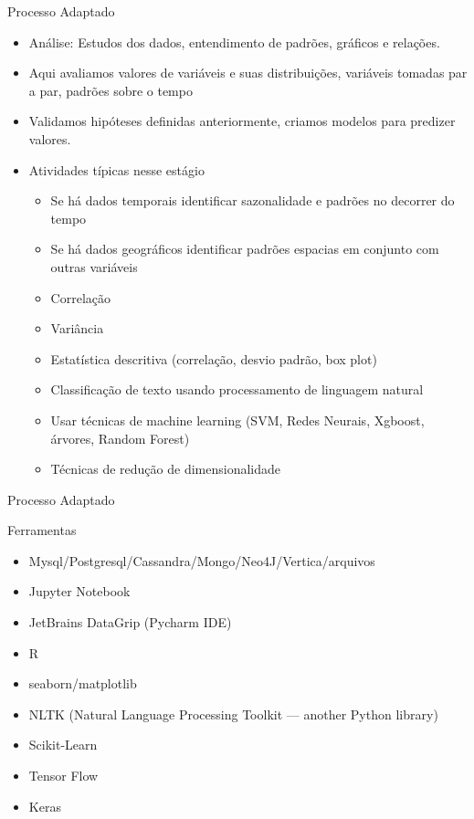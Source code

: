\begin{frame}
	\begin{block}{Processo Adaptado}
		\begin{itemize}
		\item Análise: Estudos dos dados, entendimento de padrões, gráficos e relações.
		\item Aqui avaliamos valores de variáveis e suas distribuições, variáveis tomadas par a par, padrões sobre o tempo
		\item Validamos hipóteses definidas anteriormente, criamos modelos para predizer valores.
		\item Atividades típicas nesse estágio
				\begin{itemize}
					\item Se há dados temporais identificar sazonalidade e padrões no decorrer do tempo
					\item Se há dados geográficos identificar padrões espacias em conjunto com outras variáveis
					\item Correlação
					\item Variância
					\item Estatística descritiva (correlação, desvio padrão, box plot)
					\item Classificação de texto usando processamento de linguagem natural
					\item  Usar técnicas de machine learning (SVM, Redes Neurais, Xgboost, árvores, Random Forest)
					\item Técnicas de redução de dimensionalidade
				\end{itemize}		
		\end{itemize}
	\end{block}
\end{frame}
    

\begin{frame}
	\begin{block}{Processo Adaptado}
	
		Ferramentas
		\begin{itemize}
			\item Mysql/Postgresql/Cassandra/Mongo/Neo4J/Vertica/arquivos
			\item Jupyter Notebook
			\item JetBrains DataGrip (Pycharm IDE)
			\item R
			\item seaborn/matplotlib
			\item NLTK (Natural Language Processing Toolkit — another Python library)
			\item Scikit-Learn
			\item Tensor Flow
			\item Keras
		\end{itemize}
	\end{block}
\end{frame}

